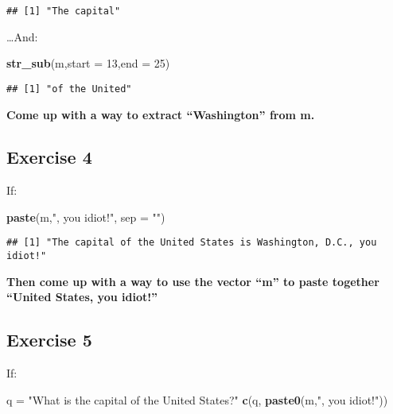 \documentclass[]{article}
\newenvironment{Shaded}{\begin{snugshade}}{\end{snugshade}}
\newcommand{\DataTypeTok}[1]{\textcolor[rgb]{0.13,0.29,0.53}{#1}}
\newcommand{\DecValTok}[1]{\textcolor[rgb]{0.00,0.00,0.81}{#1}}
\newcommand{\KeywordTok}[1]{\textcolor[rgb]{0.13,0.29,0.53}{\textbf{#1}}}
\newcommand{\NormalTok}[1]{#1}
\newcommand{\StringTok}[1]{\textcolor[rgb]{0.31,0.60,0.02}{#1}}
\begin{document}
\begin{verbatim}
## [1] "The capital"
\end{verbatim}

\ldots{}And:

\begin{Shaded}
\begin{Highlighting}[]
\KeywordTok{str_sub}\NormalTok{(m,}\DataTypeTok{start =} \DecValTok{13}\NormalTok{,}\DataTypeTok{end =} \DecValTok{25}\NormalTok{)}
\end{Highlighting}
\end{Shaded}

\begin{verbatim}
## [1] "of the United"
\end{verbatim}

\textbf{Come up with a way to extract ``Washington'' from m.}

\hypertarget{exercise-4}{%
\subsection{Exercise 4}\label{exercise-4}}

If:

\begin{Shaded}
\begin{Highlighting}[]
\KeywordTok{paste}\NormalTok{(m,}\StringTok{", you idiot!"}\NormalTok{, }\DataTypeTok{sep =} \StringTok{""}\NormalTok{)}
\end{Highlighting}
\end{Shaded}

\begin{verbatim}
## [1] "The capital of the United States is Washington, D.C., you idiot!"
\end{verbatim}

\textbf{Then come up with a way to use the vector ``m'' to paste
together ``United States, you idiot!''}

\hypertarget{exercise-5}{%
\subsection{Exercise 5}\label{exercise-5}}

If:

\begin{Shaded}
\begin{Highlighting}[]
\NormalTok{q =}\StringTok{ "What is the capital of the United States?"}
\KeywordTok{c}\NormalTok{(q, }\KeywordTok{paste0}\NormalTok{(m,}\StringTok{", you idiot!"}\NormalTok{))}
\end{Highlighting}
\end{Shaded}
\end{document}
